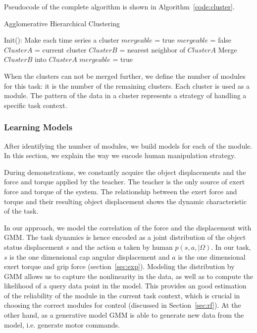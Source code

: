 Pseudocode of the complete algorithm is shown in Algorithm~\ref{code:cluster}.

\begin{algorithm}
  \caption{Agglomerative Hierarchical Clustering}
  \begin{algorithmic}[1]
    \State Init(): Make each time series a cluster\;
    \State $mergeable$ = true\;
      \State $mergeable$ = false\;
        \State $ClusterA$ = current cluster\;
        \State $ClusterB$ = nearest neighbor of $ClusterA$\;
            \State Merge $ClusterB$ into $ClusterA$\;
            \State $mergeable$ = true\;
        \EndIf
      \EndFor
    \EndWhile
    \EndFunction
  \end{algorithmic}
  \label{code:cluster}
\end{algorithm}



When the clusters can not be merged further, we define the number of modules for this task: it is the number of the remaining clusters. Each cluster is used as a module. The pattern of the data in a cluster represents a strategy of handling a specific task context.

\subsubsection{Learning Models}
\label{sec:model}
After identifying the number of modules, we build models for each of the module. In this section, we explain the way we encode human manipulation strategy.

During demonstrations, we constantly acquire the object displacements and the force and torque applied by the teacher. The teacher is the only source of exert force and torque of the system. The relationship between the exert force and torque and their resulting object displacement shows the dynamic characteristic of the task.

In our approach, we model the correlation of the force and the displacement with GMM. The task dynamics is hence encoded as a joint distribution of the object status displacement $s$ and the action $a$ taken by human $p(s,a,{\mid}{\Omega})$. In our task, $s$ is the one dimensional cap angular displacement and $a$ is the one dimensional exert torque and grip force (section~\ref{sec:exp}).
Modeling the distribution by GMM allows us to capture the nonlinearity in the data, as well as to compute the likelihood of a query data point in the model. This provides an good estimation of the reliability of the module in the current task context, which is crucial in choosing the correct modules for control (discussed in Section~\ref{sec:rf}). At the other hand, as a generative model GMM is able to generate new data from the model, i.e. generate motor commands.

